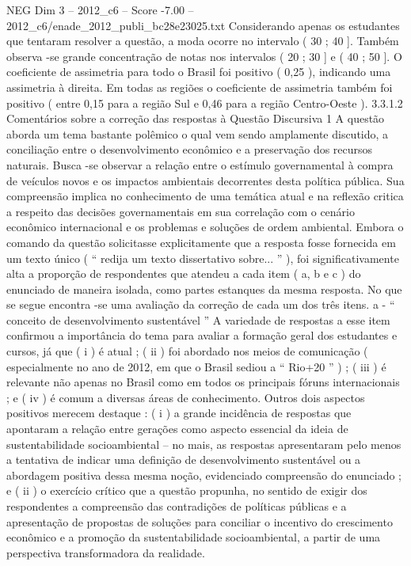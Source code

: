 \begin{textsample}{NEG Dim 3 – 2012\_c6 – Score -7.00 – 2012\_c6/enade\_2012\_publi\_bc28e23025.txt}
Considerando apenas os estudantes que tentaram resolver a questão, a moda ocorre no intervalo ( 30 ; 40 ].
Também observa -se grande concentração de notas nos intervalos ( 20 ; 30 ] e ( 40 ; 50 ].
O coeficiente de assimetria para todo o Brasil foi positivo ( 0,25 ), indicando uma assimetria à direita.
Em todas as regiões o coeficiente de assimetria também foi positivo ( entre 0,15 para a região Sul e 0,46 para a região Centro-Oeste ). 3.3.1.2 Comentários sobre a correção das respostas à Questão Discursiva 1 A questão aborda um tema bastante polêmico o qual vem sendo amplamente discutido, a conciliação entre o desenvolvimento econômico e a preservação dos recursos naturais.
Busca -se observar a relação entre o estímulo governamental à compra de veículos novos e os impactos ambientais decorrentes desta política pública.
Sua compreensão implica no conhecimento de uma temática atual e na reflexão critica a respeito das decisões governamentais em sua correlação com o cenário econômico internacional e os problemas e soluções de ordem ambiental.
Embora o comando da questão solicitasse explicitamente que a resposta fosse fornecida em um texto único ( “ redija um texto dissertativo sobre... ” ), foi significativamente alta a proporção de respondentes que atendeu a cada item ( a, b e c ) do enunciado de maneira isolada, como partes estanques da mesma resposta.
No que se segue encontra -se uma avaliação da correção de cada um dos três itens. a - “ conceito de desenvolvimento sustentável ” A variedade de respostas a esse item confirmou a importância do tema para avaliar a formação geral dos estudantes e cursos, já que ( i ) é atual ; ( ii ) foi abordado nos meios de comunicação ( especialmente no ano de 2012, em que o Brasil sediou a “ Rio+20 ” ) ; ( iii ) é relevante não apenas no Brasil como em todos os principais fóruns internacionais ; e ( iv ) é comum a diversas áreas de conhecimento.
Outros dois aspectos positivos merecem destaque : ( i ) a grande incidência de respostas que apontaram a relação entre gerações como aspecto essencial da ideia de sustentabilidade socioambiental – no mais, as respostas apresentaram pelo menos a tentativa de indicar uma definição de desenvolvimento sustentável ou a abordagem positiva dessa mesma noção, evidenciado compreensão do enunciado ; e ( ii ) o exercício crítico que a questão propunha, no sentido de exigir dos respondentes a compreensão das contradições de políticas públicas e a apresentação de propostas de soluções para conciliar o incentivo do crescimento econômico e a promoção da sustentabilidade socioambiental, a partir de uma perspectiva transformadora da realidade.

\end{textsample}
